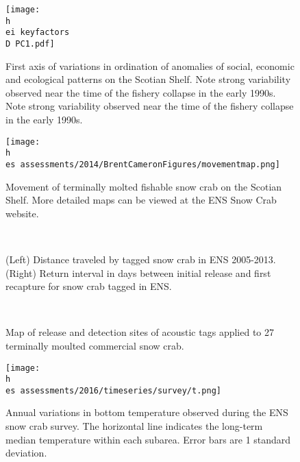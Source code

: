 \documentclass[11pt]{article}
\newcommand{\D}{.}
\newcommand{\h}{/home/hubleyb/}
\newcommand{\es}{bio.data/bio.snowcrab/}
\newcommand{\ei}{bio.data/bio.indicators/}
\begin{document}
\begin{figure}
\centering
\texttt{[image: \\h \\ei keyfactors\\D PC1.pdf]}
\caption{First axis of variations in ordination of anomalies of social, economic and ecological patterns on the Scotian Shelf. Note strong variability observed near the time of the fishery collapse in the early 1990s. Note strong variability observed near the time of the fishery collapse in the early 1990s.}
\end{figure}
\clearpage



\begin{figure}
\centering
\texttt{[image: \\h \\es assessments/2014/BrentCameronFigures/movementmap.png]}
\caption{Movement of terminally molted fishable snow crab on the Scotian Shelf. More detailed maps can be viewed at the ENS Snow Crab website.}
\end{figure}

\begin{figure}
\centering
{}\
\\

\caption{(Left) Distance traveled by tagged snow crab in ENS 2005-2013. (Right) Return interval in days between initial release and first recapture for snow crab tagged in ENS.}
\end{figure}
\clearpage


\begin{figure}
\centering
{}\

\caption{Map of release and detection sites of acoustic tags applied to 27 terminally moulted commercial snow crab.}
\end{figure}
\clearpage


\begin{figure}
\centering
\texttt{[image: \\h \\es assessments/2016/timeseries/survey/t.png]} %
\caption{Annual variations in bottom temperature observed during the ENS snow crab survey. The horizontal line indicates the long-term median temperature within each subarea. Error bars are 1 standard deviation. }
\end{figure}
\clearpage
\end{document}
